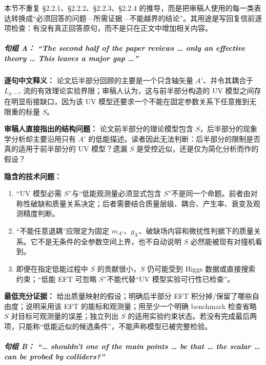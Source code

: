 \documentclass[
  chinese,
  UTF8]{ctexart}
\providecommand{\tightlist}{%
  \setlength{\itemsep}{0pt}\setlength{\parskip}{0pt}}
\begin{document}
本节不重复 §2.2.1、§2.2.2、§2.2.3、§2.2.4
的推导，而是把审稿人使用的每一类表达转换成``必须回答的问题---所需证据---不能越界的结论''。其用途是写回复信前逐项检查：有没有真正回答原句，而不是只在正文中增加相关内容。

\subparagraph{句组 A： ``The second half of the paper reviews \ldots{}
only an effective theory \ldots{} This leaves a major gap
\ldots''}\label{ux53e5ux7ec4-a-the-second-half-of-the-paper-reviews-only-an-effective-theory-this-leaves-a-major-gap}

\textbf{逐句中文释义：} 论文后半部分回顾的主要是一个只含轴矢量
\(A'\)、并令其耦合于 \(L_{\mu-\tau}\)
流的有效理论实验界限；审稿人认为，这与前半部分构造的 UV
模型之间存在明显衔接缺口，因为该 UV
模型还要求一个不能在固定参数关系下任意推到无限重的标量 \(S\)。

\textbf{审稿人直接指出的结构问题：} 论文前半部分的理论模型包含
\(S\)，后半部分的现象学分析却主要沿用只有 \(A'\)
的低能描述。读者因此无法判断：后半部分的限制是否真的适用于前半部分的 UV
模型？遗漏 \(S\) 是受控近似，还是仅为简化分析而作的假设？

\textbf{隐含的技术问题：}

\begin{enumerate}
\def\labelenumi{\arabic{enumi}.}
\tightlist
\item
  ``UV 模型必需 \(S\)''与``低能观测量必须显式包含
  \(S\)''不是同一个命题。前者由对称性破缺和质量关系决定；后者需要结合质量层级、耦合、产生率、衰变及观测精度判断。
\item
  ``不能任意退耦''应限定为固定
  \(m_{A'}\)、\(g_X\)、破缺场内容和微扰性判据下的质量关系。它不是无条件的全参数空间上界，也不自动说明
  \(S\) 必然能被现有对撞机看到。
\item
  即便在指定低能过程中 \(S\) 的贡献很小，\(S\) 仍可能受到 Higgs
  数据或直接搜索约束；``低能 EFT 可忽略 \(S\)''不能代替``UV
  模型实验可行性已检查''。
\end{enumerate}

\textbf{最低充分证据：} 给出质量映射的假设；明确后半部分 EFT
积分掉/保留了哪些自由度；说明采用该 EFT 的能标和观测量；用至少一个明确
benchmark 检查省略 \(S\) 对目标可观测量的误差；独立列出 \(S\)
的适用实验约束状态。若没有完成最后两项，只能称``低能近似的候选条件''，不能声称模型已被完整检验。

\subparagraph{句组 B： ``\ldots{} shouldn't one of the main points
\ldots{} be that \ldots{} the scalar \ldots{} can be probed by
colliders?''}\label{ux53e5ux7ec4-b-shouldnt-one-of-the-main-points-be-that-the-scalar-can-be-probed-by-colliders}
\end{document}

